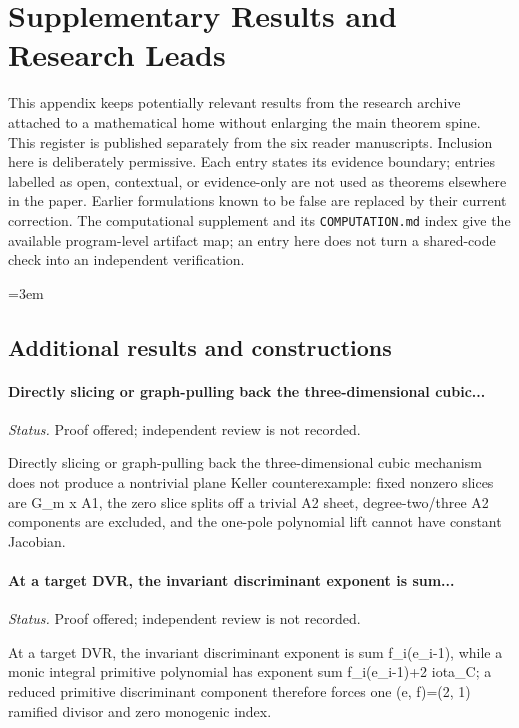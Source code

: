 \section{Supplementary Results and Research Leads}
\label{app:supplementary-register-06}

This appendix keeps potentially relevant results from the research
archive attached to a mathematical home without enlarging the main
theorem spine.  This register is published separately from the six reader manuscripts.  Inclusion here is deliberately permissive.  Each entry
states its evidence boundary; entries labelled as open, contextual, or
evidence-only are not used as theorems elsewhere in the paper.  Earlier
formulations known to be false are replaced by their current correction.
The computational supplement and its \texttt{COMPUTATION.md} index give
the available program-level artifact map; an entry here does not turn a
shared-code check into an independent verification.
\begingroup\raggedright\emergencystretch=3em

\subsection{Additional results and constructions}

\label{supp-note-06-001}
\paragraph{Directly slicing or graph-pulling back the three-dimensional cubic...}
\emph{Status.} Proof offered; independent review is not recorded.

Directly slicing or graph-pulling back the three-dimensional cubic mechanism does not produce a nontrivial plane Keller counterexample: fixed nonzero slices are G\_m x A1, the zero slice splits off a trivial A2 sheet, degree-two/three A2 components are excluded, and the one-pole polynomial lift cannot have constant Jacobian.

\label{supp-note-06-002}
\paragraph{At a target DVR, the invariant discriminant exponent is sum...}
\emph{Status.} Proof offered; independent review is not recorded.

At a target DVR, the invariant discriminant exponent is sum f\_i(e\_i-1), while a monic integral primitive polynomial has exponent sum f\_i(e\_i-1)+2 iota\_C; a reduced primitive discriminant component therefore forces one (e, f)=(2, 1) ramified divisor and zero monogenic index.


